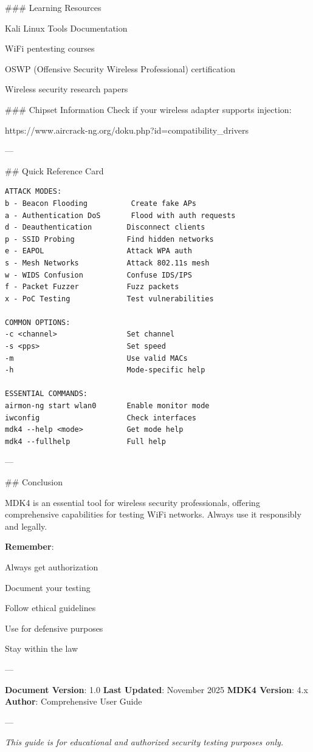 \documentclass[11pt,a4paper]{article}
\begin{document}
\#\#\# Learning Resources
\item Kali Linux Tools Documentation
\item WiFi pentesting courses
\item OSWP (Offensive Security Wireless Professional) certification
\item Wireless security research papers

\#\#\# Chipset Information
Check if your wireless adapter supports injection:
\item https://www.aircrack-ng.org/doku.php?id=compatibility\_drivers

---

\#\# Quick Reference Card

\begin{lstlisting}
ATTACK MODES:
b - Beacon Flooding          Create fake APs
a - Authentication DoS       Flood with auth requests
d - Deauthentication        Disconnect clients
p - SSID Probing            Find hidden networks
e - EAPOL                   Attack WPA auth
s - Mesh Networks           Attack 802.11s mesh
w - WIDS Confusion          Confuse IDS/IPS
f - Packet Fuzzer           Fuzz packets
x - PoC Testing             Test vulnerabilities

COMMON OPTIONS:
-c <channel>                Set channel
-s <pps>                    Set speed
-m                          Use valid MACs
-h                          Mode-specific help

ESSENTIAL COMMANDS:
airmon-ng start wlan0       Enable monitor mode
iwconfig                    Check interfaces
mdk4 --help <mode>          Get mode help
mdk4 --fullhelp             Full help
\end{lstlisting}

---

\#\# Conclusion

MDK4 is an essential tool for wireless security professionals, offering comprehensive capabilities for testing WiFi networks. Always use it responsibly and legally.

\textbf{Remember}:
\item Always get authorization
\item Document your testing
\item Follow ethical guidelines
\item Use for defensive purposes
\item Stay within the law

---

\textbf{Document Version}: 1.0
\textbf{Last Updated}: November 2025
\textbf{MDK4 Version}: 4.x
\textbf{Author}: Comprehensive User Guide

---

\textit{This guide is for educational and authorized security testing purposes only.}
\end{document}
